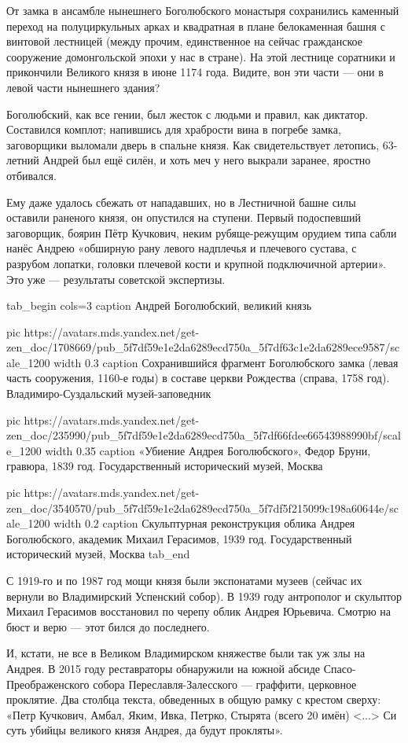 От замка в ансамбле нынешнего Боголюбского монастыря сохранились каменный
переход на полуциркульных арках и квадратная в плане белокаменная башня с
винтовой лестницей (между прочим, единственное на сейчас гражданское сооружение
домонгольской эпохи у нас в стране). На этой лестнице соратники и прикончили
Великого князя в июне 1174 года. Видите, вон эти части — они в левой части
нынешнего здания?

Боголюбский, как все гении, был жесток с людьми и правил, как диктатор.
Составился комплот; напившись для храбрости вина в погребе замка, заговорщики
выломали дверь в спальне князя. Как свидетельствует летопись, 63-летний Андрей
был ещё силён, и хоть меч у него выкрали заранее, яростно отбивался.

Ему даже удалось сбежать от нападавших, но в Лестничной башне силы оставили
раненого князя, он опустился на ступени. Первый подоспевший заговорщик, боярин
Пётр Кучкович, неким рубяще-режущим орудием типа сабли нанёс Андрею «обширную
рану левого надплечья и плечевого сустава, с разрубом лопатки, головки плечевой
кости и крупной подключичной артерии». Это уже — результаты советской
экспертизы. 

\ifcmt
tab_begin cols=3
	caption Андрей Боголюбский, великий князь

  pic https://avatars.mds.yandex.net/get-zen_doc/1708669/pub_5f7df59e1e2da6289ecd750a_5f7df63c1e2da6289ece9587/scale_1200
  width 0.3
	caption Сохранившийся фрагмент Боголюбского замка (левая часть сооружения, 1160-е годы) в составе церкви Рождества (справа, 1758 год). Владимиро-Суздальский музей-заповедник

  pic https://avatars.mds.yandex.net/get-zen_doc/235990/pub_5f7df59e1e2da6289ecd750a_5f7df66fdee66543988990bf/scale_1200
  width 0.35
	caption «Убиение Андрея Боголюбского», Федор Бруни, гравюра, 1839 год. Государственный исторический музей, Москва

  pic https://avatars.mds.yandex.net/get-zen_doc/3540570/pub_5f7df59e1e2da6289ecd750a_5f7df5f215099c198a60644e/scale_1200
  width 0.2
	caption Скульптурная реконструкция облика Андрея Боголюбского, академик Михаил Герасимов, 1939 год. Государственный исторический музей, Москва
tab_end
\fi

С 1919-го и по 1987 год мощи князя были экспонатами музеев (сейчас их вернули
во Владимирский Успенский собор). В 1939 году антрополог и скульптор Михаил
Герасимов восстановил по черепу облик Андрея Юрьевича. Смотрю на бюст и верю —
этот бился до последнего.

И, кстати, не все в Великом Владимирском княжестве были так уж злы на Андрея. В
2015 году реставраторы обнаружили на южной абсиде Спасо-Преображенского собора
Переславля-Залесского — граффити, церковное проклятие. Два столбца текста,
обведенных в общую рамку с крестом сверху: «Петр Кучкович, Амбал, Яким, Ивка,
Петрко, Стырята (всего 20 имён) <...> Си суть убийцы великого князя Андрея, да
будут прокляты».

